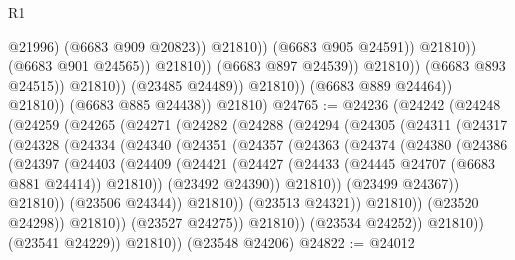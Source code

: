 \begin{lexlean}{R1}
\begin{coremodule}
                                                    @21996)
                                                  (@6683 @909 @20823))
                                                @21810))
                                            (@6683 @905 @24591))
                                          @21810))
                                      (@6683 @901 @24565))
                                    @21810))
                                (@6683 @897 @24539))
                              @21810))
                          (@6683 @893 @24515))
                        @21810))
                    (@23485 @24489))
                  @21810))
              (@6683 @889 @24464))
            @21810))
        (@6683 @885 @24438))
      @21810)
@24765 := @24236
    (@24242
      (@24248
        (@24259
          (@24265
            (@24271
              (@24282
                (@24288
                  (@24294
                    (@24305
                      (@24311
                        (@24317
                          (@24328
                            (@24334
                              (@24340
                                (@24351
                                  (@24357
                                    (@24363
                                      (@24374
                                        (@24380
                                          (@24386
                                            (@24397
                                              (@24403
                                                (@24409
                                                  (@24421
                                                    (@24427
                                                      (@24433
                                                        (@24445 @24707 (@6683 @881 @24414))
                                                        @21810))
                                                    (@23492 @24390))
                                                  @21810))
                                              (@23499 @24367))
                                            @21810))
                                        (@23506 @24344))
                                      @21810))
                                  (@23513 @24321))
                                @21810))
                            (@23520 @24298))
                          @21810))
                      (@23527 @24275))
                    @21810))
                (@23534 @24252))
              @21810))
          (@23541 @24229))
        @21810))
    (@23548 @24206)
@24822 := @24012

\end{coremodule}
\end{lexlean}
